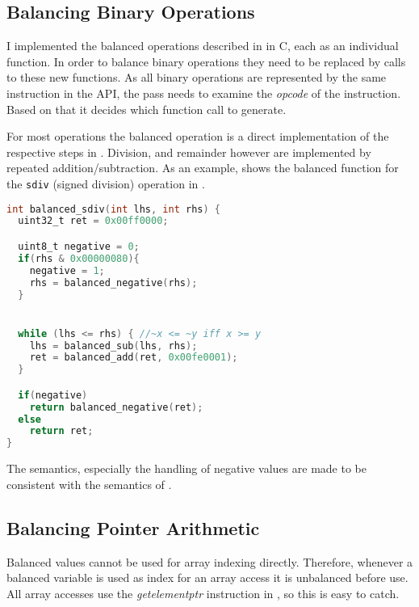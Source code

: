 
\subsection{Balancing Binary Operations}
I implemented the balanced operations described in  in C, each as an individual function.
In order to balance binary operations they need to be replaced by calls to these new functions.
As all binary operations are represented by the same instruction in the \llvm{} API, the pass needs to examine the \emph{opcode} of the instruction.
Based on that it decides which function call to generate.

For most operations the balanced operation is a direct implementation of the respective steps in .
Division, and remainder however are implemented by repeated addition/subtraction.
As an example,  shows the balanced function for the \texttt{sdiv} (signed division) operation in \ir{}.

\begin{lstlisting}[language=C, caption=Balanced sdiv, label=lst:sdiv]
int balanced_sdiv(int lhs, int rhs) {
  uint32_t ret = 0x00ff0000;

  uint8_t negative = 0;
  if(rhs & 0x00000080){
    negative = 1;
    rhs = balanced_negative(rhs);
  }


  while (lhs <= rhs) { //~x <= ~y iff x >= y
    lhs = balanced_sub(lhs, rhs);
    ret = balanced_add(ret, 0x00fe0001);
  }

  if(negative)
    return balanced_negative(ret);
  else
    return ret;
}
\end{lstlisting}

The semantics, especially the handling of negative values are made to be consistent with the semantics of \llvm{}.

\subsection{Balancing Pointer Arithmetic}
Balanced values cannot be used for array indexing directly.
Therefore, whenever a balanced variable is used as index for an array access it is unbalanced before use.
All array accesses use the \emph{getelementptr} instruction in \ir{}, so this is easy to catch.

